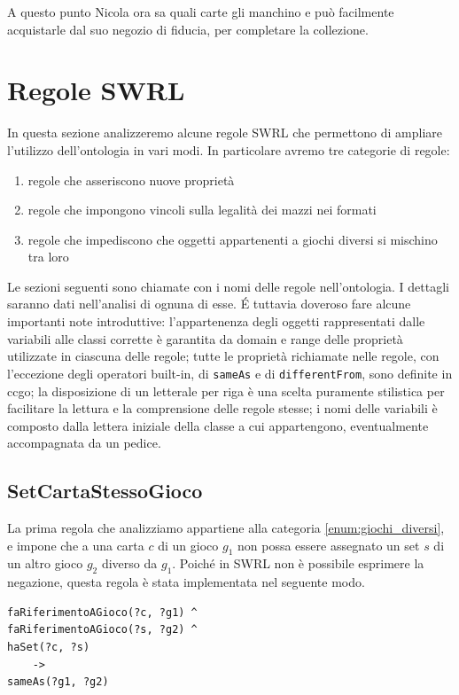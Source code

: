 \documentclass[12pt]{article}
\begin{document}
A questo punto Nicola ora sa quali carte gli manchino e può facilmente acquistarle dal suo negozio di fiducia, per completare la collezione.

\newpage
\section{Regole SWRL}
In questa sezione analizzeremo alcune regole SWRL che permettono di ampliare l'utilizzo dell'ontologia in vari modi. In particolare avremo tre categorie di regole:
\begin{enumerate}
    \item regole che asseriscono nuove proprietà \label{enum:nuove_prop}
    \item regole che impongono vincoli sulla legalità dei mazzi nei formati \label{enum:vincoli_legalita}
    \item regole che impediscono che oggetti appartenenti a giochi diversi si mischino tra loro \label{enum:giochi_diversi}
\end{enumerate}
Le sezioni seguenti sono chiamate con i nomi delle regole nell'ontologia. I dettagli saranno dati nell'analisi di ognuna di esse.
\'E tuttavia doveroso fare alcune importanti note introduttive:  l'appartenenza degli oggetti rappresentati dalle variabili alle classi corrette è garantita da domain e range delle proprietà utilizzate in ciascuna delle regole; tutte le proprietà richiamate nelle regole, con l'eccezione degli operatori built-in, di \lstinline [language=SPARQL]{sameAs} e di \lstinline [language=SPARQL]{differentFrom}, sono definite in ccgo; la disposizione di un letterale per riga è una scelta puramente stilistica per facilitare la lettura e la comprensione delle regole stesse; i nomi delle variabili è composto dalla lettera iniziale della classe a cui appartengono, eventualmente accompagnata da un pedice.


\subsection{SetCartaStessoGioco}
La prima regola che analizziamo appartiene alla categoria \ref{enum:giochi_diversi}, e impone che a una carta $c$ di un gioco $g_1$ non possa essere assegnato un set $s$ di un altro gioco $g_2$ diverso da $g_1$. Poiché in SWRL non è possibile esprimere la negazione, questa regola è stata implementata nel seguente modo.

\begin{lstlisting}[language=SPARQL]
faRiferimentoAGioco(?c, ?g1) ^ 
faRiferimentoAGioco(?s, ?g2) ^ 
haSet(?c, ?s) 
    -> 
sameAs(?g1, ?g2)
\end{lstlisting}
\end{document}
